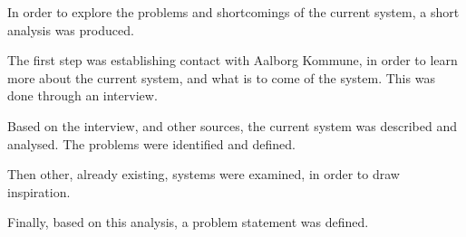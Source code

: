 In order to explore the problems and shortcomings of the current \citybike system, a short analysis was produced.

The first step was establishing contact with Aalborg Kommune, in order to learn more about the current system, and what is to come of the system.
This was done through an interview.

Based on the interview, and other sources, the current system was described and analysed.
The problems were identified and defined.

Then other, already existing, systems were examined, in order to draw inspiration.

Finally, based on this analysis, a problem statement was defined.
